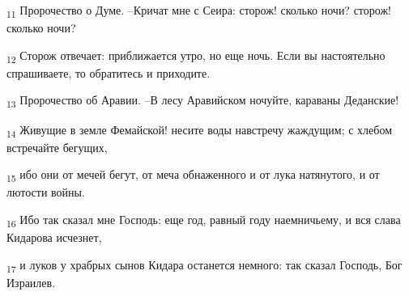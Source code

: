 \begin{tcolorbox}
\textsubscript{11} Пророчество о Думе. --Кричат мне с Сеира: сторож! сколько ночи? сторож! сколько ночи?
\end{tcolorbox}
\begin{tcolorbox}
\textsubscript{12} Сторож отвечает: приближается утро, но еще ночь. Если вы настоятельно спрашиваете, то обратитесь и приходите.
\end{tcolorbox}
\begin{tcolorbox}
\textsubscript{13} Пророчество об Аравии. --В лесу Аравийском ночуйте, караваны Деданские!
\end{tcolorbox}
\begin{tcolorbox}
\textsubscript{14} Живущие в земле Фемайской! несите воды навстречу жаждущим; с хлебом встречайте бегущих,
\end{tcolorbox}
\begin{tcolorbox}
\textsubscript{15} ибо они от мечей бегут, от меча обнаженного и от лука натянутого, и от лютости войны.
\end{tcolorbox}
\begin{tcolorbox}
\textsubscript{16} Ибо так сказал мне Господь: еще год, равный году наемничьему, и вся слава Кидарова исчезнет,
\end{tcolorbox}
\begin{tcolorbox}
\textsubscript{17} и луков у храбрых сынов Кидара останется немного: так сказал Господь, Бог Израилев.
\end{tcolorbox}

